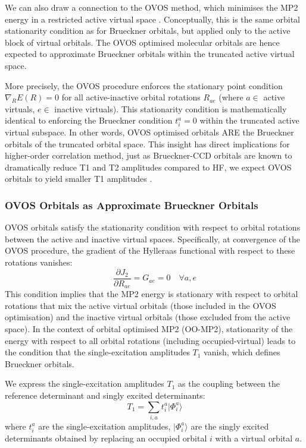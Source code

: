 We can also draw a connection to the OVOS method, which minimises the MP2 energy in a restricted active virtual space \cite{Adamowicz1987}. Conceptually, this is the same orbital stationarity condition as for Brueckner orbitals, but applied only to the active block of virtual orbitals. The OVOS optimised molecular orbitals are hence expected to approximate Brueckner orbitals within the truncated active virtual space.

More precisely, the OVOS procedure enforces the stationary point condition $\nabla_R E(R) = 0$ for all active-inactive orbital rotations $R_{ae}$ (where $a \in$ active virtuals, $e \in$ inactive virtuals). This stationarity condition is mathematically identical to enforcing the Brueckner condition $t_i^a = 0$ within the truncated active virtual subspace. In other words, OVOS optimised orbitals ARE the Brueckner orbitals of the truncated orbital space. This insight has direct implications for higher-order correlation method, just as Brueckner-CCD orbitals are known to dramatically reduce T1 and T2 amplitudes compared to HF, we expect OVOS orbitals to yield smaller T1 amplitudes \cite{Handy1989, Purvis1982}.


\subsubsection{OVOS Orbitals as Approximate Brueckner Orbitals}

OVOS orbitals satisfy the stationarity condition with respect to orbital rotations between the active and inactive virtual spaces. Specifically, at convergence of the OVOS procedure, the gradient of the Hylleraas functional with respect to these rotations vanishes:
\begin{equation}
    \frac{\partial J_2}{\partial R_{ae}} = G_{ae} = 0 \quad \forall a,e
\end{equation}
This condition implies that the MP2 energy is stationary with respect to orbital rotations that mix the active virtual orbitals (those included in the OVOS optimisation) and the inactive virtual orbitals (those excluded from the active space). In the context of orbital optimised MP2 (OO-MP2), stationarity of the energy with respect to all orbital rotations (including occupied-virtual) leads to the condition that the single-excitation amplitudes $T_1$ vanish, which defines Brueckner orbitals. 

We express the single-excitation amplitudes $T_1$ as the coupling between the reference determinant and singly excited determinants:
\begin{equation}
    T_1 = \sum_{i,a} t_i^a |\Phi_i^a\rangle 
\end{equation}
where $t_i^a$ are the single-excitation amplitudes, $|\Phi_i^a\rangle$ are the singly excited determinants obtained by replacing an occupied orbital $i$ with a virtual orbital $a$. 

